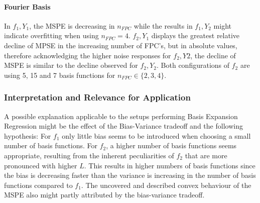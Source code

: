 \documentclass[11pt,twoside,a4paper]{article}
\begin{document}
	\paragraph{Fourier Basis}
	In $f_1,Y_1$, the MSPE is decreasing in $n_{FPC}$ while the results in $f_1,Y_2$ might indicate overfitting when using $n_{FPC} = 4$. $f_2,Y_1$ displays the greatest relative decline of MPSE in the increasing number of FPC's, but in absolute values, therefore acknowledging the higher noise responses for $f_2,Y2$, the decline of MSPE is similar to the decline observed for $f_2,Y_2$. Both configurations of $f_2$ are using 5, 15 and 7 basis functions for $n_{FPC} \in \{2, 3, 4 \}$.
	\vspace{-0.2cm}	
	
	\subsubsection{Interpretation and Relevance for Application}
	A possible explanation applicable to the setups performing Basis Expansion Regression might be the effect of the Bias-Variance tradeoff and the following hypothesis: For $f_1$ only little bias seems to be introduced when choosing a small number of basis functions. For $f_2$, a higher number of basis functions seems appropriate, resulting from the inherent peculiarities of $f_2$ that are more pronounced with higher $L$. This results in higher numbers of basis functions since the bias is decreasing faster than the variance is increasing in the number of basis functions compared to $f_1$. The uncovered and described convex behaviour of the MSPE also might partly attributed by the bias-variance tradeoff. 
	
\end{document}
